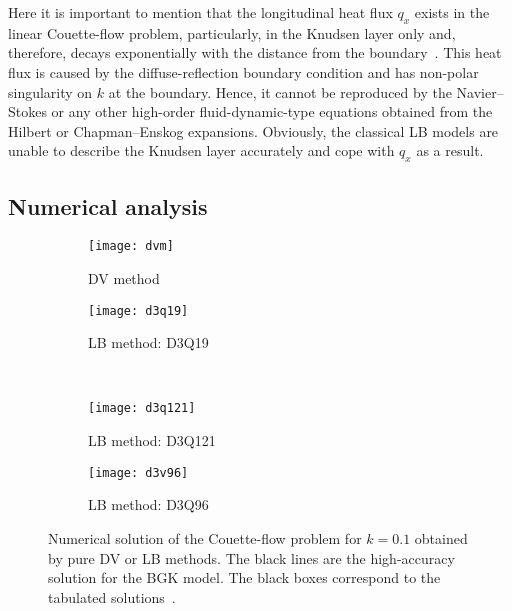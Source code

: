 \documentclass{elsarticle} %
\begin{document}
Here it is important to mention that the longitudinal heat flux $q_x$ exists in the linear Couette-flow problem,
particularly, in the Knudsen layer only and, therefore, decays exponentially with the distance from the boundary~\cite{Sone2007}.
This heat flux is caused by the diffuse-reflection boundary condition and has non-polar singularity on $k$ at the boundary.
Hence, it cannot be reproduced by the Navier--Stokes or any other high-order fluid-dynamic-type equations
obtained from the Hilbert or Chapman--Enskog expansions.
Obviously, the classical LB models are unable to describe the Knudsen layer accurately and cope with \(q_x\) as a result.

\subsection{Numerical analysis}

\begin{figure}
    \centering
    \begin{subfigure}[b]{0.5\textwidth}
        \texttt{[image: dvm]}
        \caption{DV method}
        \label{fig:dvm}
    \end{subfigure}%
    \begin{subfigure}[b]{0.5\textwidth}
        \texttt{[image: d3q19]}
        \caption{LB method: D3Q19}
        \label{fig:d3q19}
    \end{subfigure}\\
    \begin{subfigure}[b]{0.5\textwidth}
        \texttt{[image: d3q121]}
        \caption{LB method: D3Q121}
        \label{fig:d3q121}
    \end{subfigure}%
    \begin{subfigure}[b]{0.5\textwidth}
        \texttt{[image: d3v96]}
        \caption{LB method: D3Q96}
        \label{fig:d3q96}
    \end{subfigure}
    \caption{
        Numerical solution of the Couette-flow problem for \(k=0.1\) obtained by pure DV or LB methods.
        The black lines are the high-accuracy solution for the BGK model.
        The black boxes correspond to the tabulated solutions~\cite{Luo2016}.
    }\label{fig:pure}
\end{figure}
\end{document}

